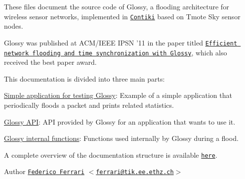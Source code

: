 These files document the source code of Glossy, a flooding architecture for wireless sensor networks, implemented in \href{http://www.sics.se/contiki/}{\tt Contiki} based on Tmote Sky sensor nodes.

Glossy was published at ACM/IEEE IPSN '11 in the paper titled \href{ftp://ftp.tik.ee.ethz.ch/pub/people/ferrarif/FZTS2011.pdf}{\tt Efficient network flooding and time synchronization with Glossy}, which also received the best paper award.

This documentation is divided into three main parts: \begin{DoxyItemize}
\item \hyperlink{group__glossy-test}{Simple application for testing Glossy}: Example of a simple application that periodically floods a packet and prints related statistics. \item \hyperlink{group__glossy__interface}{Glossy API}: API provided by Glossy for an application that wants to use it. \item \hyperlink{group__glossy__internal}{Glossy internal functions}: Functions used internally by Glossy during a flood.\end{DoxyItemize}
A complete overview of the documentation structure is available \href{modules.html}{\tt here}.

\begin{DoxyAuthor}{Author}
\href{http://www.tik.ee.ethz.ch/~ferrarif}{\tt Federico Ferrari} $<$\href{mailto:ferrari@tik.ee.ethz.ch}{\tt ferrari@tik.ee.ethz.ch}$>$ 
\end{DoxyAuthor}
